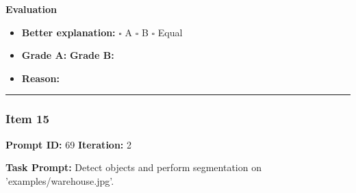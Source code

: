 \documentclass[11pt]{article}
\begin{document}
\vspace{1em}

\textbf{Evaluation}
\begin{itemize}
    \item \textbf{Better explanation:} \hspace{1em} $\square$ A \hspace{1em} $\square$ B \hspace{1em} $\square$ Equal
    \item \textbf{Grade A:} \underline{\hspace{2cm}} \hspace{1em} \textbf{Grade B:} \underline{\hspace{2cm}}
    \item \textbf{Reason:} \\[4.5em]
\end{itemize}

\vspace{1em}
\hrule
\vspace{1em}


\subsubsection*{Item 15}
\textbf{Prompt ID:} 69 \hfill \textbf{Iteration:} 2

\textbf{Task Prompt:} Detect objects and perform segmentation on 'examples/warehouse.jpg'.
\end{document}
